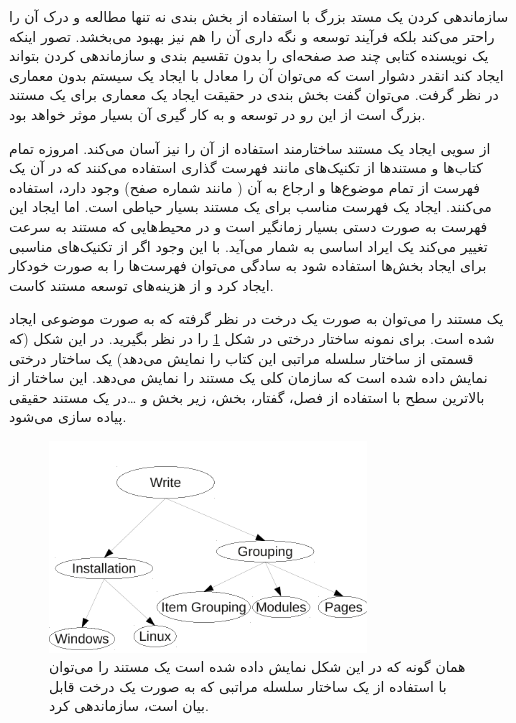 سازماندهی کردن یک مستد بزرگ با استفاده از بخش بندی نه تنها مطالعه و درک آن را
راحتر می‌کند بلکه فرآیند توسعه و نگه داری آن را هم نیز بهبود می‌بخشد. تصور اینکه
یک نویسنده کتابی چند صد صفحه‌ای را بدون تقسیم بندی و سازماندهی کردن بتواند ایجاد
کند انقدر دشوار است که می‌توان آن را معادل با ایجاد یک سیستم بدون معماری در نظر
گرفت. می‌توان گفت بخش بندی در حقیقت ایجاد یک معماری برای یک مستند بزرگ است از
این رو در توسعه و به کار گیری آن بسیار موثر خواهد بود.

از سویی ایجاد یک مستند ساختارمند استفاده از آن را نیز آسان می‌کند. امروزه تمام
کتاب‌ها و مستندها از تکنیک‌های مانند فهرست گذاری استفاده می‌کنند که در آن  یک
فهرست از تمام موضوع‌ها و ارجاع به آن ( مانند شماره صفح) وجود دارد، استفاده
می‌کنند. ایجاد یک فهرست مناسب برای یک مستند بسیار حیاطی است. اما ایجاد این فهرست
به صورت دستی بسیار زمانگیر است و در محیط‌هایی که مستند به سرعت تغییر می‌کند یک
ایراد اساسی به شمار می‌آید. با این وجود اگر از تکنیک‌های مناسبی برای ایجاد
بخش‌ها استفاده شود به سادگی می‌توان فهرست‌ها را به صورت خودکار ایجاد کرد و از
هزینه‌های توسعه مستند کاست.

یک مستند را می‌توان به صورت یک درخت در نظر گرفته که به صورت موضوعی ایجاد شده
است. برای نمونه ساختار درختی در شکل 
\ref{images/write/grouping/section-tree} را در نظر بگیرید. در این شکل (که قسمتی
از ساختار سلسله مراتبی این کتاب را نمایش می‌دهد) یک ساختار درختی نمایش داده شده
است که سازمان کلی یک مستند را نمایش می‌دهد. این ساختار از بالاترین سطح با
استفاده از فصل، گفتار، بخش، زیر بخش  و \ldots در یک مستند حقیقی پیاده سازی
می‌شود.

\begin{figure}
	\centering
	\includegraphics[width=0.75\textwidth]{images/write/grouping/section-tree}
	\caption[ساختار سلسله مراتبی یک مستند]{
		همان گونه که در این شکل نمایش داده شده است یک مستند را می‌توان با استفاده
		از یک ساختار سلسله مراتبی که به صورت یک درخت قابل بیان است، سازماندهی کرد.
	}
	\label{images/write/grouping/section-tree}
\end{figure}

